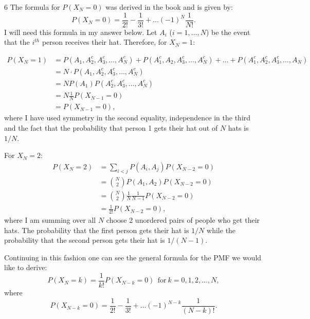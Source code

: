 \begin{problem} {6}  The formula for $P(X_N=0)$ was derived in the book and is given by:
\begin{equation*}
P(X_N=0) = \frac{1}{2!}-\frac{1}{3!} + \ldots  (-1)^{N}\frac{1}{N!}.
\end{equation*}
I will need this formula in my answer below.  Let $A_i$ ($i=1, \ldots, N$) be the event that the $i^{th}$ person receives their hat.  Therefore, for $X_N=1$:

\begin{align*}
P(X_N=1) & = P(A_1, A_2^c, A_3^c, \ldots, A_N^c)+ P(A_1^c, A_2, A_3^c, \ldots, A_N^c)+\ldots+ P(A_1^c, A_2^c, A_3^c, \ldots, A_N) \\
& = N\cdot P(A_1, A_2^c, A_3^c, \ldots, A_N^c) \\
& = N P(A_1) P(A_2^c, A_3^c, \ldots, A_N^c) \\
& =  N \frac{1}{N} P(X_{N-1}=0) \\
&= P(X_{N-1}=0),
\end{align*}
where I have used symmetry in the second equality, independence in the third and the fact that the probability that person 1 gets their hat out of $N$ hats is $1/N$.

For $X_N=2$:
\begin{align*}
P(X_N=2) & = \sum_{i<j} P(A_i, A_j) P(X_{N-2}=0)\\
& = \binom{N}{2}P(A_1, A_2) P(X_{N-2}=0) \\
& = \binom{N}{2}\frac{1}{N}\frac{1}{N-1} P(X_{N-2}=0) \\
& = \frac{1}{2!} P(X_{N-2}=0),
\end{align*}
where I am summing over all $N$ choose 2 unordered pairs of people who get their hats.  The probability that the first person gets their hat is $1/N$ while the probability that the second person gets their hat is $1/(N-1)$.

Continuing in this fashion one can see the general formula for the PMF we would like to derive:
\begin{equation*}
P(X_N=k) = \frac{1}{k!} P(X_{N-k}=0)~~\mathrm{for}~k=0, 1, 2, \ldots, N,
\end{equation*}
where
\begin{equation*}
P(X_{N-k}=0) =  \frac{1}{2!}-\frac{1}{3!} + \ldots  (-1)^{N-k}\frac{1}{(N-k)!}.
\end{equation*}
\end{problem}

